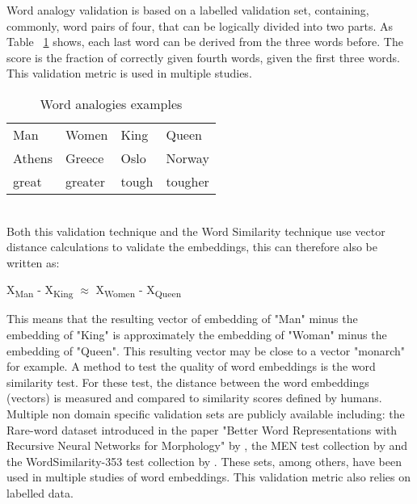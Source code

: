\documentclass[../../Thesis.tex]{subfiles}
\begin{document}
\begin{jumpin}
Word analogy validation is based on a labelled validation set, containing, commonly, word pairs of four, that can be logically divided into two parts. As  Table
~\ref{table:wordAnalogies} shows, each last word can be derived from the three words before. The score is the fraction of correctly given fourth words, given the first three words. This validation metric is used in multiple studies\cite{mikolov2013distributed, mikolov2013efficient, dai2015document, pennington2014glove}.\\
\begin{table}[hbt]
\begin{center}
\begin{tabular}{l l l l}
Man & Women & King & Queen \\
Athens & Greece & Oslo & Norway\\
great & greater & tough & tougher
\end{tabular}
\end{center}
\caption{Word analogies examples}\label{table:wordAnalogies}
\end{table}\\
Both this validation technique and the Word Similarity technique use vector distance calculations to validate the embeddings, this can therefore also be written as:
\begin{displayquote}
	X\textsubscript{Man} - X\textsubscript{King} $\approx$  X\textsubscript{Women} - X\textsubscript{Queen}
\end{displayquote}
This means that the resulting vector of embedding of "Man" minus the embedding of "King" is approximately the embedding of "Woman" minus the embedding of "Queen". This resulting vector may be close to a vector "monarch" for example.
A method to test the quality of word embeddings is the word similarity test. For these test, the distance between the word embeddings (vectors) is measured and compared to similarity scores defined by humans. Multiple non domain specific validation sets are publicly available including: the Rare-word dataset introduced in the paper "Better Word Representations with Recursive Neural Networks for Morphology" by \citet{luong2013better}, 
the MEN test collection by \citet{EBruniMENCollection} and the WordSimilarity-353 test collection by \citet{EGabrilovichWScollection}.
These sets, among others, have been used in multiple studies of word embeddings\cite{pennington2014glove, mikolov2013efficient}. This validation metric also relies on labelled data.

\end{jumpin}
\end{document}

